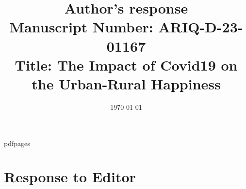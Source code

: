 \marginsize{2cm}{2cm}{0cm}{1cm} %
\renewcommand\familydefault{\sfdefault}


 \renewcommand{\topfraction}{.9}	%
 \renewcommand{\bottomfraction}{.9}	%
 \renewcommand{\textfraction}{0.1}	%

 
\newenvironment{ig}[1]{
\begin{center}
 \texttt{[image: \#1]} 
\end{center}}

\usepackage{pdfpages}

\newlength\tindent
\setlength{\tindent}{\parindent}
\setlength{\parindent}{0pt}
\renewcommand{\indent}{\hspace*{\tindent}}

 
\date{{}\today}
\title{Author's response\\ {\large Manuscript Number: ARIQ-D-23-01167 \\ Title:  The Impact of Covid19 on the Urban-Rural Happiness %
  }}

\author{}


\maketitle

\tableofcontents

\section{Response to Editor} 


